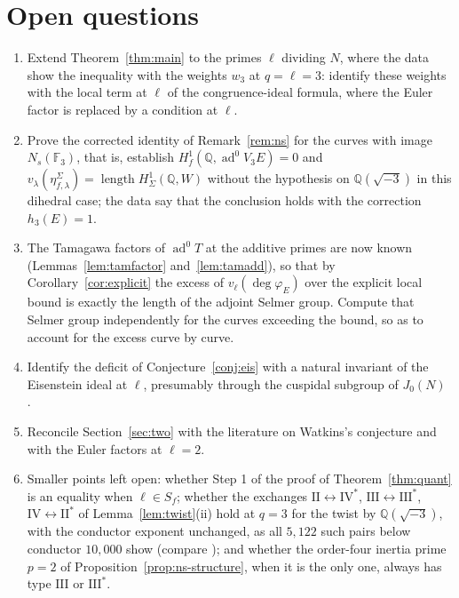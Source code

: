\documentclass[11pt]{amsart}
\theoremstyle{definition}
\newcommand{\Q}{\mathbb{Q}}
\newcommand{\F}{\mathbb{F}}
\newcommand{\degphi}{\deg\varphi_E}
\newcommand{\ad}{\operatorname{ad}^0}
\newcommand{\len}{\operatorname{length}}
\begin{document}
\section{Open questions}
\begin{enumerate}
\item Extend Theorem~\ref{thm:main} to the primes $\ell$ dividing $N$, where the data show the inequality with the weights $w_3$ at $q=\ell=3$: identify these weights with the local term at $\ell$ of the congruence-ideal formula, where the Euler factor is replaced by a condition at $\ell$.
\item Prove the corrected identity of Remark~\ref{rem:ns} for the curves with image $N_s(\F_3)$, that is, establish $H^1_f(\Q,\ad V_3E)=0$ and $v_\lambda(\eta^\Sigma_{f,\lambda})=\len H^1_\Sigma(\Q,W)$ without the hypothesis on $\Q(\sqrt{-3})$ in this dihedral case; the data say that the conclusion holds with the correction $h_3(E)=1$.
\item The Tamagawa factors of $\ad T$ at the additive primes are now known (Lemmas~\ref{lem:tamfactor} and~\ref{lem:tamadd}), so that by Corollary~\ref{cor:explicit} the excess of $v_\ell(\degphi)$ over the explicit local bound is exactly the length of the adjoint Selmer group. Compute that Selmer group independently for the curves exceeding the bound, so as to account for the excess curve by curve.
\item Identify the deficit of Conjecture~\ref{conj:eis} with a natural invariant of the Eisenstein ideal at $\ell$, presumably through the cuspidal subgroup of $J_0(N)$ \cite{Mazur77}.
\item Reconcile Section~\ref{sec:two} with the literature on Watkins's conjecture and with the Euler factors at $\ell=2$.
\item Smaller points left open: whether Step 1 of the proof of Theorem~\ref{thm:quant} is an equality when $\ell\in S_f$; whether the exchanges $\mathrm{II}\leftrightarrow\mathrm{IV}^*$, $\mathrm{III}\leftrightarrow\mathrm{III}^*$, $\mathrm{IV}\leftrightarrow\mathrm{II}^*$ of Lemma~\ref{lem:twist}(ii) hold at $q=3$ for the twist by $\Q(\sqrt{-3})$, with the conductor exponent unchanged, as all $5{,}122$ such pairs below conductor $10{,}000$ show (compare \cite{Kraus89,Papadopoulos93}); and whether the order-four inertia prime $p=2$ of Proposition~\ref{prop:ns-structure}, when it is the only one, always has type $\mathrm{III}$ or $\mathrm{III}^*$.
\end{enumerate}

\appendix
\end{document}
